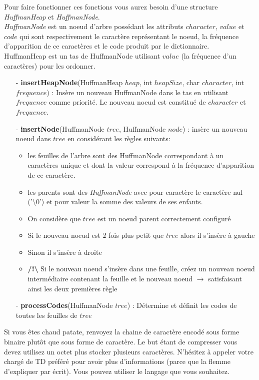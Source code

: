 \documentclass[11pt]{extarticle}
\begin{document}
Pour faire fonctionner ces fonctions vous aurez besoin d'une structure \textit{HuffmanHeap} et \textit{HuffmanNode}.\\
\textit{HuffmanNode} est un noeud d'arbre possédant les attributs $character$, $value$ et $code$ qui sont respectivement le caractère représentant le noeud, la fréquence d'apparition de ce caractères et le code produit par le dictionnaire. \\
HuffmanHeap est un tas de HuffmanNode utilisant $value$ (la fréquence d'un caractères) pour les ordonner.
\begin{itemize}
\item[ - \textbf{insertHeapNode}(HuffmanHeap $heap$, int $heapSize$, char $character$, int $frequence$)]: Insère un nouveau HuffmanNode dans le tas en utilisant $frequence$ comme priorité. Le nouveau noeud est constitué de $character$ et $frequence$.
\item[ - \textbf{insertNode}(HuffmanNode $tree$, HuffmanNode $node$)]: insère un nouveau noeud dans $tree$ en considérant les règles suivants:
\begin{itemize}
\item les feuilles de l'arbre sont des HuffmanNode correspondant à un caractères unique et dont la valeur correspond à la fréquence d'apparition de ce caractère.
\item les parents sont des \textit{HuffmanNode} avec pour caractère le caractère nul ('\textbackslash0') et pour valeur la somme des valeurs de ses enfants.
\item On considère que $tree$ est un noeud parent correctement configuré
\item Si le nouveau noeud est 2 fois plus petit que $tree$ alors il s'insère à gauche
\item Sinon il s'insère à droite
\item \textbf{/!\textbackslash} Si le nouveau noeud s'insère dans une feuille, créez un nouveau noeud intermédiaire contenant la feuille et le nouveau noeud $\rightarrow$ satisfaisant ainsi les deux premières règle
\end{itemize}
\item[ - \textbf{processCodes}(HuffmanNode $tree$)]: Détermine et définit les codes de toutes les feuilles de $tree$
\end{itemize}
Si vous êtes chaud patate, renvoyez la chaine de caractère encodé sous forme binaire plutôt que sous forme de caractère. Le but étant de compresser vous devez utilisez un octet plus stocker plusieurs caractères. N'hésitez à appeler votre chargé de TD préféré pour avoir plus d'informations (parce que la flemme d'expliquer par écrit).
Vous pouvez utiliser le langage que vous souhaitez.
\end{document}
